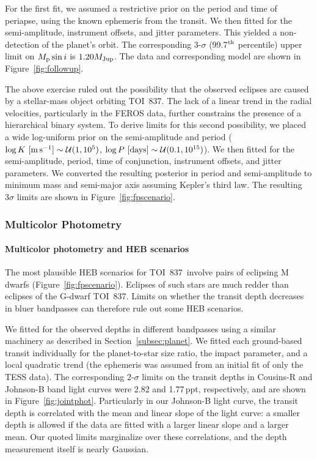 \documentclass[12pt,twocolumn,tighten]{aastex63}
\newcommand{\tn}{TOI~837} %
\begin{document}
For the first fit, we assumed a restrictive prior on the period and
time of periapse, using the known ephemeris from the transit.  We then
fitted for the semi-amplitude, instrument offsets, and jitter
parameters.  This yielded a non-detection of the planet's orbit.  The
corresponding 3-$\sigma$ (99.7$^{\rm th}$ percentile) upper limit on
$M_{\rm p} \sin i$ is $1.20 M_{\rm Jup}$.  The data and corresponding
model are shown in Figure~\ref{fig:followup}.

The above exercise ruled out the possibility that the observed
eclipses are caused by a stellar-mass object orbiting \tn.  The lack
of a linear trend in the radial velocities, particularly in the FEROS
data, further constrains the presence of a hierarchical binary system.
To derive limits for this second possibility, we placed a wide
log-uniform prior on the semi-amplitude and period ($\log K\ [{\rm
m\,s^{-1}}] \sim \mathcal{U}(1,10^5)$, $\log P\ [{\rm days}] \sim
\mathcal{U}(0.1, 10^{15})$).  We then fitted for the semi-amplitude,
period, time of conjunction, instrument offsets, and jitter
parameters.  We converted the resulting posterior in period and
semi-amplitude to minimum mass and semi-major axis assuming Kepler's
third law.  The resulting $3\sigma$ limits are shown in
Figure~\ref{fig:fpscenario}.

\subsubsection{Multicolor Photometry}
\label{subsec:colorphot}

\paragraph{Multicolor photometry and HEB scenarios}
The most plausible HEB scenarios for \tn\ involve pairs of eclipsing M
dwarfs (Figure~\ref{fig:fpscenario}).  Eclipses of such stars are much
redder than eclipses of the G-dwarf \tn.  Limits on whether the
transit depth decreases in bluer bandpasses can therefore rule out
some HEB scenarios.

We fitted for the observed depths in different bandpasses using a
similar machinery as described in Section~\ref{subsec:planet}.  We
fitted each ground-based transit individually for the planet-to-star
size ratio, the impact parameter, and a local quadratic trend (the
ephemeris was assumed from an initial fit of only the TESS data).  The
corresponding $2$-$\sigma$ limits on the transit depths in Cousins-R
and Johnson-B band light curves were 2.82 and 1.77$\,$ppt,
respectively, and are shown in Figure~\ref{fig:jointphot}.
Particularly in our Johnson-B light curve, the transit depth is
correlated with the mean and linear slope of the light curve: a
smaller depth is allowed if the data are fitted with a larger linear
slope and a larger mean.  Our quoted limits marginalize over these
correlations, and the depth measurement itself is nearly Gaussian.
\end{document}

